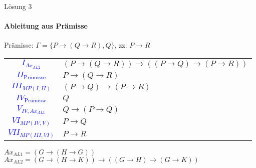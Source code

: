 \begin{frame}{Lösung 3}
	\framesubtitle{Ableitung aus Prämisse}
	Prämisse: $\Gamma =\{P\rightarrow(Q\rightarrow R), Q\}$, zz: $P\rightarrow R$\\
	\begin{tabular}{cl}
		\textcolor{blue}{$I_{Ax_{AL2}}$}         & $(P\rightarrow(Q\rightarrow R))\rightarrow((P\rightarrow Q)\rightarrow(P\rightarrow R))$ \\
		\textcolor{blue}{$II_{\text{Prämisse}}$} & $P\rightarrow(Q\rightarrow R)$                                                           \\
		\textcolor{blue}{$III_{MP(I, II)}$}      & $(P\rightarrow Q)\rightarrow(P\rightarrow R)$                                            \\
		\textcolor{blue}{$IV_{\text{Prämisse}}$} & $Q$                                                                                      \\
		\textcolor{blue}{$V_{IV, Ax_{AL1}}$}     & $Q\rightarrow(P\rightarrow Q)$                                                           \\
		\textcolor{blue}{$VI_{MP(IV, V)}$}       & $P\rightarrow Q$                                                                         \\
		\textcolor{blue}{$VII_{MP(III, VI)}$}    & $P\rightarrow R$                                                                         \\
	\end{tabular}
	$Ax_{AL1} = (G\rightarrow(H\rightarrow G))$\\
	$Ax_{AL2} = (G\rightarrow(H\rightarrow K))\rightarrow((G\rightarrow H)\rightarrow(G\rightarrow K))$\\
\end{frame}
